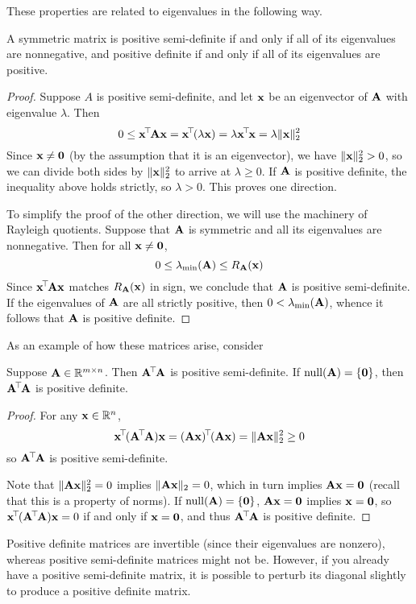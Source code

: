 These properties are related to eigenvalues in the following way.
\begin{proposition}
A symmetric matrix is positive semi-definite if and only if all of its eigenvalues are nonnegative, and positive definite if and only if all of its eigenvalues are positive.
\end{proposition}
\begin{proof}
Suppose $A$ is positive semi-definite, and let $\mathbf{x}$ be an eigenvector of $\mathbf{A}$ with eigenvalue $\lambda$.
Then
\[0 \leq \mathbf{x}^{\!\top\!}\mathbf{A}\mathbf{x} = \mathbf{x}^{\!\top\!}(\lambda\mathbf{x}) = \lambda\mathbf{x}^{\!\top\!}\mathbf{x} = \lambda\|\mathbf{x}\|_2^2\]
Since $\mathbf{x} \neq \mathbf{0}$ (by the assumption that it is an eigenvector), we have $\|\mathbf{x}\|_2^2 > 0$, so we can divide both sides by $\|\mathbf{x}\|_2^2$ to arrive at $\lambda \geq 0$.
If $\mathbf{A}$ is positive definite, the inequality above holds strictly, so $\lambda > 0$.
This proves one direction.

To simplify the proof of the other direction, we will use the machinery of Rayleigh quotients.
Suppose that $\mathbf{A}$ is symmetric and all its eigenvalues are nonnegative.
Then for all $\mathbf{x} \neq \mathbf{0}$,
\[0 \leq \lambda_{\min}(\mathbf{A}) \leq R_{\mathbf{A}}(\mathbf{x})\]
Since $\mathbf{x}^{\!\top\!}\mathbf{A}\mathbf{x}$ matches $R_{\mathbf{A}}(\mathbf{x})$ in sign, we conclude that $\mathbf{A}$ is positive semi-definite.
If the eigenvalues of $\mathbf{A}$ are all strictly positive, then $0 < \lambda_{\min}(\mathbf{A})$, whence it follows that $\mathbf{A}$ is positive definite.
\end{proof}
As an example of how these matrices arise, consider
\begin{proposition}
Suppose $\mathbf{A} \in \mathbb{R}^{m \times n}$.
Then $\mathbf{A}^{\!\top\!}\mathbf{A}$ is positive semi-definite.
If $\operatorname*{null}(\mathbf{A}) = \{\mathbf{0}\}$, then $\mathbf{A}^{\!\top\!}\mathbf{A}$ is positive definite.
\end{proposition}
\begin{proof}
For any $\mathbf{x} \in \mathbb{R}^n$,
\[\mathbf{x}^{\!\top\!} (\mathbf{A}^{\!\top\!}\mathbf{A})\mathbf{x} = (\mathbf{A}\mathbf{x})^{\!\top\!}(\mathbf{A}\mathbf{x}) = \|\mathbf{A}\mathbf{x}\|_2^2 \geq 0\]
so $\mathbf{A}^{\!\top\!}\mathbf{A}$ is positive semi-definite.

Note that $\|\mathbf{A}\mathbf{x}\|_2^2 = 0$ implies $\|\mathbf{A}\mathbf{x}\|_2 = 0$, which in turn implies $\mathbf{A}\mathbf{x} = \mathbf{0}$ (recall that this is a property of norms).
If $\operatorname*{null}(\mathbf{A}) = \{\mathbf{0}\}$, $\mathbf{A}\mathbf{x} = \mathbf{0}$ implies $\mathbf{x} = \mathbf{0}$, so $\mathbf{x}^{\!\top\!} (\mathbf{A}^{\!\top\!}\mathbf{A})\mathbf{x} = 0$ if and only if $\mathbf{x} = \mathbf{0}$, and thus $\mathbf{A}^{\!\top\!}\mathbf{A}$ is positive definite.
\end{proof}
Positive definite matrices are invertible (since their eigenvalues are nonzero), whereas positive semi-definite matrices might not be.
However, if you already have a positive semi-definite matrix, it is possible to perturb its diagonal slightly to produce a positive definite matrix.
